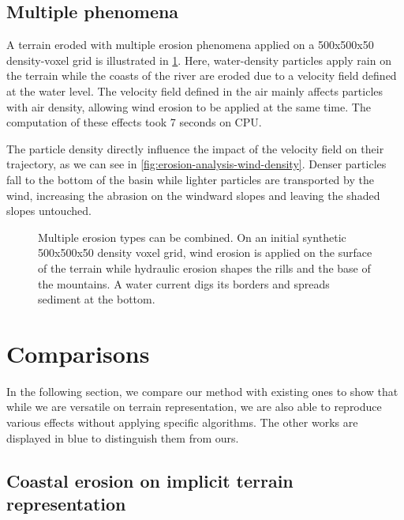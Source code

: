 \subsection{Multiple phenomena} 

A terrain eroded with multiple erosion phenomena applied on a 500x500x50 density-voxel grid is illustrated in \cref{fig:erosion-multiErosions}. Here, water-density particles apply rain on the terrain while the coasts of the river are eroded due to a velocity field defined at the water level. The velocity field defined in the air mainly affects particles with air density, allowing wind erosion to be applied at the same time. The computation of these effects took 7 seconds on CPU. 

The particle density directly influence the impact of the velocity field on their trajectory, as we can see in \cref{fig:erosion-analysis-wind-density}. Denser particles fall to the bottom of the basin while lighter particles are transported by the wind, increasing the abrasion on the windward slopes and leaving the shaded slopes untouched.

\begin{figure}
    \caption{Multiple erosion types can be combined. On an initial synthetic 500x500x50 density voxel grid, wind erosion is applied on the surface of the terrain while hydraulic erosion shapes the rills and the base of the mountains. A water current digs its borders and spreads sediment at the bottom.}
    \label{fig:erosion-multiErosions}
\end{figure}

\section{Comparisons}

In the following section, we compare our method with existing ones to show that while we are versatile on terrain representation, we are also able to reproduce various effects without applying specific algorithms. The other works are displayed in blue to distinguish them from ours.

\subsection{Coastal erosion on implicit terrain representation}

